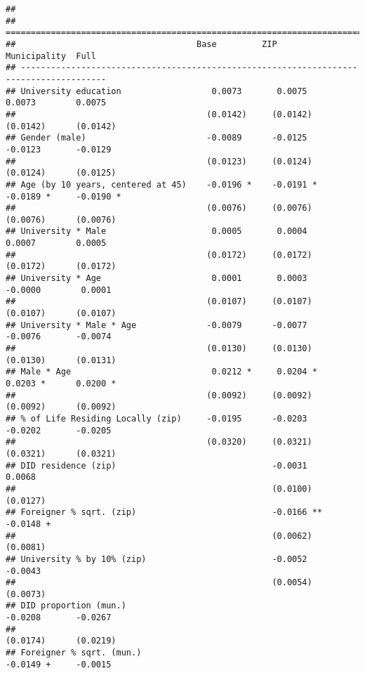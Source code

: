 \documentclass[
]{article}
\begin{document}
\begin{verbatim}
## 
## =======================================================================================
##                                    Base         ZIP           Municipality  Full       
## ---------------------------------------------------------------------------------------
## University education                  0.0073       0.0075        0.0073        0.0075  
##                                      (0.0142)     (0.0142)      (0.0142)      (0.0142) 
## Gender (male)                        -0.0089      -0.0125       -0.0123       -0.0129  
##                                      (0.0123)     (0.0124)      (0.0124)      (0.0125) 
## Age (by 10 years, centered at 45)    -0.0196 *    -0.0191 *     -0.0189 *     -0.0190 *
##                                      (0.0076)     (0.0076)      (0.0076)      (0.0076) 
## University * Male                     0.0005       0.0004        0.0007        0.0005  
##                                      (0.0172)     (0.0172)      (0.0172)      (0.0172) 
## University * Age                      0.0001       0.0003       -0.0000        0.0001  
##                                      (0.0107)     (0.0107)      (0.0107)      (0.0107) 
## University * Male * Age              -0.0079      -0.0077       -0.0076       -0.0074  
##                                      (0.0130)     (0.0130)      (0.0130)      (0.0131) 
## Male * Age                            0.0212 *     0.0204 *      0.0203 *      0.0200 *
##                                      (0.0092)     (0.0092)      (0.0092)      (0.0092) 
## % of Life Residing Locally (zip)     -0.0195      -0.0203       -0.0202       -0.0205  
##                                      (0.0320)     (0.0321)      (0.0321)      (0.0321) 
## DID residence (zip)                               -0.0031                      0.0068  
##                                                   (0.0100)                    (0.0127) 
## Foreigner % sqrt. (zip)                           -0.0166 **                  -0.0148 +
##                                                   (0.0062)                    (0.0081) 
## University % by 10% (zip)                         -0.0052                     -0.0043  
##                                                   (0.0054)                    (0.0073) 
## DID proportion (mun.)                                           -0.0208       -0.0267  
##                                                                 (0.0174)      (0.0219) 
## Foreigner % sqrt. (mun.)                                        -0.0149 +     -0.0015  

\end{verbatim}
\end{document}
